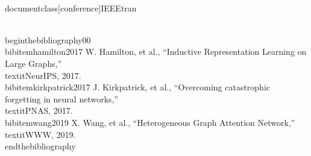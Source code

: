 \\documentclass[conference]{IEEEtran}
\begin{document}
\
\\begin{thebibliography}{00}
\\bibitem{hamilton2017} W. Hamilton, et al., ``Inductive Representation Learning on Large Graphs,'' \\textit{NeurIPS}, 2017.
\\bibitem{kirkpatrick2017} J. Kirkpatrick, et al., ``Overcoming catastrophic forgetting in neural networks,'' \\textit{PNAS}, 2017.
\\bibitem{wang2019} X. Wang, et al., ``Heterogeneous Graph Attention Network,'' \\textit{WWW}, 2019.
\\end{thebibliography}

\
\end{document}
